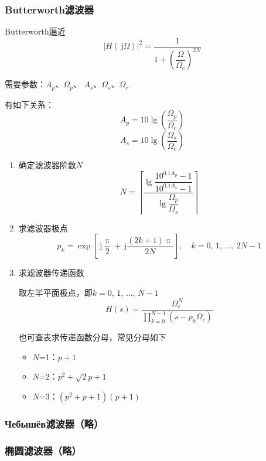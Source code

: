 \documentclass[UTF8,fontset=fandol,zihao=5]{ctexart}
\newcommand{\jj}{\,\mathrm{j}}
\begin{document}
\subsubsection{Butterworth滤波器}

Butterworth逼近
\[
\left|H(\jj\varOmega)\right|^2=\dfrac{1}{1+\left(\dfrac{\varOmega}{\varOmega_c}\right)^{2N}}
\]

\begin{methodbox}[设计Butterworth滤波器]
  
  需要参数：$A_p$、$\varOmega_p$、
  $A_s$、$\varOmega_s$、$\varOmega_c$
  
  有如下关系：
  \[
  A_p=10\lg\left(\frac{\varOmega_p}{\varOmega_c}\right)
  \]
  \[
  A_s=10\lg\left(\frac{\varOmega_s}{\varOmega_c}\right)
  \]

  \begin{enumerate}
    \item 确定滤波器阶数$N$
    \[
    N=\left\lceil\frac{\lg{\dfrac{10^{0.1A_p}-1}{10^{0.1A_s}-1}}}{\lg {\dfrac{\varOmega_p}{\varOmega_s}}}\right\rceil
    \]

    \item 求滤波器极点
    \[
    p_k=\exp\left[\displaystyle\jj\dfrac{\uppi}{2}+\displaystyle\jj\dfrac{(2k+1)\uppi}{2N}\right], \quad k=0,\,1,\,\ldots,\,2N-1
    \]

    \item 求滤波器传递函数
    
    取左半平面极点，即$k=0,\,1,\,\ldots,\,N-1$
    \[
    H(s)=\frac{\varOmega_c^N}{\displaystyle\prod_{k=0}^{N-1}(s-p_k\varOmega_c)}
    \]

    也可查表求传递函数分母，常见分母如下
    \begin{itemize}
      \item $N$=1：$p+1$
      \item $N$=2：$p^2+\sqrt{2}p+1$
      \item $N$=3：$(p^2+p+1)(p+1)$
    \end{itemize}
  \end{enumerate}
\end{methodbox}

\subsubsection{\russianfont Чебышёв滤波器（略）}

\subsubsection{椭圆滤波器（略）}
\end{document}
